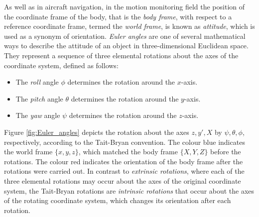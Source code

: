 As well as in aircraft navigation, in the motion monitoring field the position of the coordinate frame of the body, that is the \emph{body frame}, with respect to a reference coordinate frame, termed the \emph{world frame}, is known as \emph{attitude}, which is used as a synonym of orientation. \emph{Euler angles} are one of several mathematical ways to describe the attitude of an object in three-dimensional Euclidean space. They represent a sequence of three elemental rotations about the axes of the coordinate system, defined as follows:

\begin{itemize}
\item The \emph{roll} angle $\phi$ determines the rotation around the $x$-axis.
\item The \emph{pitch} angle $\theta$ determines the rotation around the $y$-axis.
\item The \emph{yaw} angle $\psi$ determines the rotation around the $z$-axis.
\end{itemize}

\noindent
Figure \ref{fig:Euler_angles} depicts the rotation about the axes $z, y', X$ by $\psi, \theta, \phi$, respectively, according to the Tait-Bryan convention. The colour blue indicates the world frame $\{x, y, z\}$, which matched the body frame $\{X, Y, Z\}$ before the rotations. The colour red indicates the orientation of the body frame after the rotations were carried out. In contrast to \emph{extrinsic rotations}, where each of the three elemental rotations may occur about the axes of the original coordinate system, the Tait-Bryan rotations are \emph{intrinsic rotations} that occur about the axes of the rotating coordinate system, which changes its orientation after each rotation.

